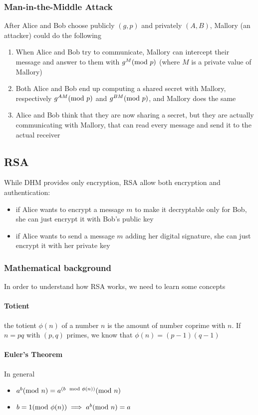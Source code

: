 \subsubsection{Man-in-the-Middle Attack}
After Alice and Bob choose publicly $(g,p)$ and privately $(A,B)$, Mallory (an attacker) could do the following
\begin{enumerate}
    \item When Alice and Bob try to communicate, Mallory can intercept their message and answer to them with $g^M(\mathrm{mod}\ p)$ (where $M$ is a private value of Mallory)
    \item Both Alice and Bob end up computing a shared secret with Mallory, respectively $g^{AM}(\mathrm{mod}\ p)$ and $g^{BM}(\mathrm{mod}\ p)$, and Mallory does the same
    \item Alice and Bob think that they are now sharing a secret, but they are actually communicating with Mallory, that can read every message and send it to the actual receiver
\end{enumerate}

\subsection{RSA}
While DHM provides only encryption, RSA allow both encryption and authentication:
\begin{itemize}
    \item if Alice wants to encrypt a message $m$ to make it decryptable only for Bob, she can just encrypt it with Bob's public key
    \item if Alice wants to send a message $m$ adding her digital signature, she can just encrypt it with her private key
\end{itemize}
\subsubsection{Mathematical background}
In order to understand how RSA works, we need to learn some concepts


\paragraph{Totient} the totient $\phi(n)$ of a number $n$ is the amount of number coprime with $n$. If $n=pq$ with $(p,q)$ primes, we know that $\phi(n)=(p-1)(q-1)$


\paragraph{Euler's Theorem} In general \begin{itemize}
    \item $a^b(\mathrm{mod}\ n)=a^{(b\mod{\phi(n))}}(\mathrm{mod}\ n)$
    \item $b=1(\mathrm{mod}\ \phi(n)) \implies a^b(\mathrm{mod}\ n)=a$
\end{itemize}


